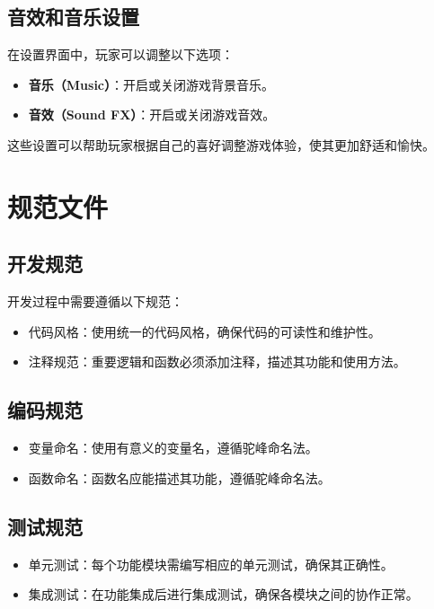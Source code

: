 \documentclass{mancls}%
\begin{document}
\subsection{音效和音乐设置}

在设置界面中，玩家可以调整以下选项：
\begin{itemize}
  \item \textbf{音乐（Music）}：开启或关闭游戏背景音乐。
  \item \textbf{音效（Sound FX）}：开启或关闭游戏音效。
\end{itemize}

这些设置可以帮助玩家根据自己的喜好调整游戏体验，使其更加舒适和愉快。
\pagebreak
\section{规范文件}

\subsection{开发规范}

开发过程中需要遵循以下规范：
\begin{itemize}
  \item 代码风格：使用统一的代码风格，确保代码的可读性和维护性。
  \item 注释规范：重要逻辑和函数必须添加注释，描述其功能和使用方法。
\end{itemize}

\subsection{编码规范}

\begin{itemize}
  \item 变量命名：使用有意义的变量名，遵循驼峰命名法。
  \item 函数命名：函数名应能描述其功能，遵循驼峰命名法。
\end{itemize}

\subsection{测试规范}

\begin{itemize}
  \item 单元测试：每个功能模块需编写相应的单元测试，确保其正确性。
  \item 集成测试：在功能集成后进行集成测试，确保各模块之间的协作正常。
\end{itemize}
\end{document}

